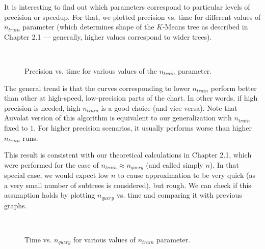 It is interesting to find out which parameters correspond to particular levels
of precision or speedup. For that, we plotted precision vs. time for different
values of $n_{train}$ parameter (which determines shape of the $K$-Means tree as
described in Chapter 2.1 --- generally, higher values correspond to wider
trees).


\begin{figure}
	\centering
	\\
	\caption{Precision vs. time for various values of the $n_{train}$ parameter.}
\end{figure}

The general trend is that the curves corresponding to lower $n_{train}$ perform
better than other at high-speed, low-precision parts of the chart. In other
words, if high precision is needed, high $n_{train}$ is a good choice (and vice
versa). Note that Auvolat version of this algorithm is equivalent to our
generalization with $n_{train}$ fixed to $1$. For higher precision 
scenarios, it usually performs worse than higher $n_{train}$ runs.

This result is consistent with our theoretical calculations in Chapter 2.1, which
were performed for the case of $n_{train} \approx n_{query}$ (and called simply $n$).
In that special case, we would expect low $n$ to cause approximation to be very
quick (as a very small number of subtrees is considered), but rough. We can
check if this assumption holds by plotting $n_{query}$ vs. time and comparing
it with previous graphs.

\begin{figure}
	\centering
	\\
	\caption{Time vs. $n_{query}$ for various values of $n_{train}$ parameter.}
\end{figure}

